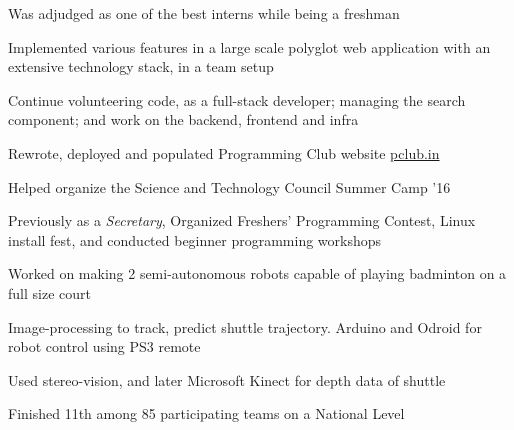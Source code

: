 \documentclass[a4paper]{deedy-resume} %
\begin{document}
\begin{minipage}[t]{0.66\textwidth}
  \runsubsection{}

  \begin{tightitemize}
  \item Was adjudged as one of the best interns while being a freshman
  \item Implemented various features in a large scale polyglot web
    application with an extensive technology stack, in a team setup
  \item Continue volunteering code, as a full-stack developer;
    managing the search component; and work on the backend, frontend and infra
  \end{tightitemize}

  \sectionspace

  \runsubsection{}
  \begin{tightitemize}
  \item Rewrote, deployed and populated Programming Club website \href{https://pclub.in}{pclub.in}
  \item Helped organize the Science and Technology Council Summer Camp
    '16
  \item Previously as a \textit{Secretary}, Organized Freshers'
    Programming Contest, Linux install fest, and conducted beginner
    programming workshops
  \end{tightitemize}

  \sectionspace

  \runsubsection{}
  \begin{tightitemize}
  \item Worked on making 2 semi-autonomous robots capable of playing badminton on a full size court
  \item Image-processing to track, predict shuttle trajectory. Arduino
    and Odroid for robot control using PS3 remote
  \item Used stereo-vision, and later Microsoft Kinect for depth data
    of shuttle
  \item Finished 11th among 85 participating teams on a National Level
  \end{tightitemize}

  \sectionspace


\end{minipage}
\end{document}
